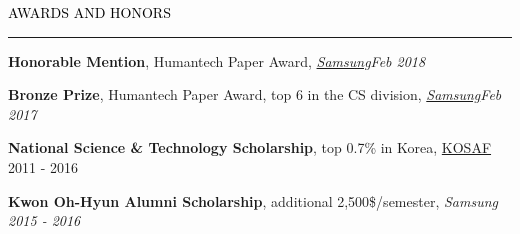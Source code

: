 \documentclass{resume} %
\renewenvironment{rSection}[1]{
	\sectionskip
	\textcolor{Black}{\MakeUppercase{#1}}
	\sectionlineskip
	\hrule
	\begin{list}{}{
			\setlength{\leftmargin}{1.5em}
		}
		\item[]
	}{
	\end{list}
}
\begin{document}

\begin{rSection}{Awards and Honors}
	\vspace*{-2.5mm}
	\begin{rSubsection}{}{}{}{}
		\item \textbf{Honorable Mention}, Humantech Paper Award, \em{\href{https://humantech.samsung.com/saitext/index.jsp}{Samsung}}\em \hfill Feb 2018
		
		\item \textbf{Bronze Prize}, Humantech Paper Award, top 6 in the CS division, \em{\href{https://humantech.samsung.com/saitext/index.jsp}{Samsung}}\em \hfill Feb 2017
		
		\item \textbf{National Science \& Technology Scholarship}, top 0.7\% in Korea, \href{http://www.kosaf.go.kr/}{KOSAF} \hfill 2011 - 2016
		
		\item \textbf{Kwon Oh-Hyun Alumni Scholarship}, additional 2,500\$/semester, \em Samsung \em \hfill 2015 - 2016
		
	\end{rSubsection}

\end{rSection}

\end{document}
